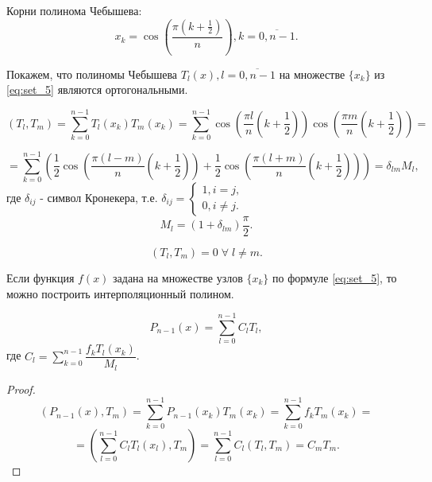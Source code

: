 Корни полинома Чебышева:
\begin{equation}\label{eq:set_5}
  x_k = \cos \left( \dfrac{\pi \left(k + \frac{1}{2}\right)}{n} \right), k = \overline{0, n - 1}.
\end{equation}

Покажем, что полиномы Чебышева $T_l (x), l = \overline{0, n - 1}$ на множестве $\{ x_k \}$ из \eqref{eq:set_5} являются ортогональными.

\begin{equation*}
  \left( T_l, T_m \right) = \sum\limits_{k = 0}^{n-1} T_l (x_k) T_m (x_k) = \sum\limits_{k = 0}^{n-1} \cos \left( \dfrac{\pi l}{n} \left(k + \frac{1}{2}\right) \right) \cos \left( \dfrac{\pi m}{n} \left(k + \frac{1}{2}\right) \right) = 
\end{equation*}

\begin{equation*}
  = \sum\limits_{k = 0}^{n-1} \left( \dfrac{1}{2} \cos\left( \dfrac{\pi (l - m)}{n} \left(k + \frac{1}{2}\right) \right)
  + \dfrac{1}{2} \cos\left( \dfrac{\pi (l + m)}{n} \left(k + \frac{1}{2}\right) \right)  \right) = \delta_{lm} M_l,
\end{equation*}
где $\delta_{ij}$ - символ Кронекера, т.е. $ \delta_{ij} = \begin{cases} 1, i = j, \\ 0, i \ne j. \end{cases}$
\begin{equation*}
  M_l = (1 + \delta_{lm}) \dfrac{\pi}{2}.
\end{equation*}

\begin{equation*}
  (T_l, T_m) = 0 \; \forall \; l \ne m.
\end{equation*}

Если функция $f(x)$ задана на множестве узлов $\{ x_k \}$ по формуле \eqref{eq:set_5}, то можно построить интерполяционный полином.

\begin{equation}\label{eq:cheb_8}
  P_{n-1}(x) = \sum\limits_{l = 0}^{n-1} C_l T_l,
\end{equation}
где $C_l = \sum\limits_{k = 0}^{n-1} \dfrac{f_k T_l (x_k)}{M_l}$.

\begin{proof}
  \begin{equation*}
    \left( P_{n-1}(x), T_m \right) = \sum\limits_{k = 0}^{n-1} P_{n-1}(x_k) T_m (x_k) = \sum\limits_{k = 0}^{n-1} f_k T_m(x_k) =
  \end{equation*}
  \begin{equation*}
    = \left( \sum\limits_{l = 0}^{n-1} C_l T_l (x_l), T_m \right) = \sum\limits_{l = 0}^{n-1} C_l (T_l, T_m) = C_m T_m.
  \end{equation*}
\end{proof}

